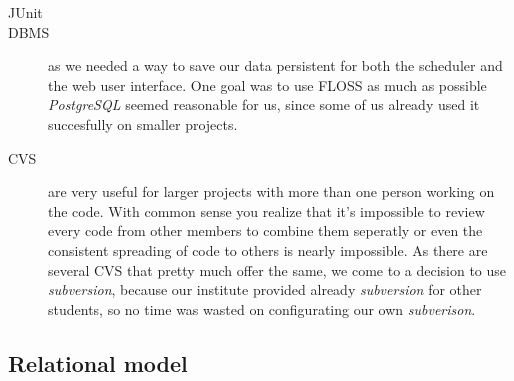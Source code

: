 \begin{description}
\item[JUnit]

\item[DBMS] as we needed a way to save our data persistent for both the scheduler and the web user interface. One goal was to use FLOSS as much as possible \emph{PostgreSQL} seemed reasonable for us, since some of us already used it succesfully on smaller projects.

\item[CVS] are very useful for larger projects with more than one person working on the code. With common sense you realize that it's impossible to review every code from other members to combine them seperatly or even the consistent spreading of code to others is nearly impossible. As there are several CVS that pretty much offer the same, we come to a decision to use \emph{subversion}, because our institute provided already \emph{subversion} for other students, so no time was wasted on configurating our own \emph{subverison}. 
\end{description}


\subsection{Relational model}


